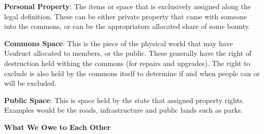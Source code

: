 \documentclass{article}
\begin{document}
\vspace{0.2cm}

 \textbf{Personal Property}: The items or space that is exclusively assigned along the legal definition. These can be either private property that came with someone into the commons, or can be the appropriators allocated share of some bounty. 
 
\vspace{0.2cm}

 \textbf{Commons Space}: This is the piece of the physical world that may have Usufruct allocated to members, or the public. These generally have the right of destruction held withing the commons (for repairs and upgrades). The right to exclude is also held by the commons itself to determine if and when people can or will be excluded.
  
 \vspace{0.2cm}
 
   \textbf{Public Space}: This is space held by the state that assigned property rights. Examples would be the roads, infrastructure and public lands such as parks. 



\pagebreak
{\huge \textbf{What We Owe to Each Other}}
\end{document}
